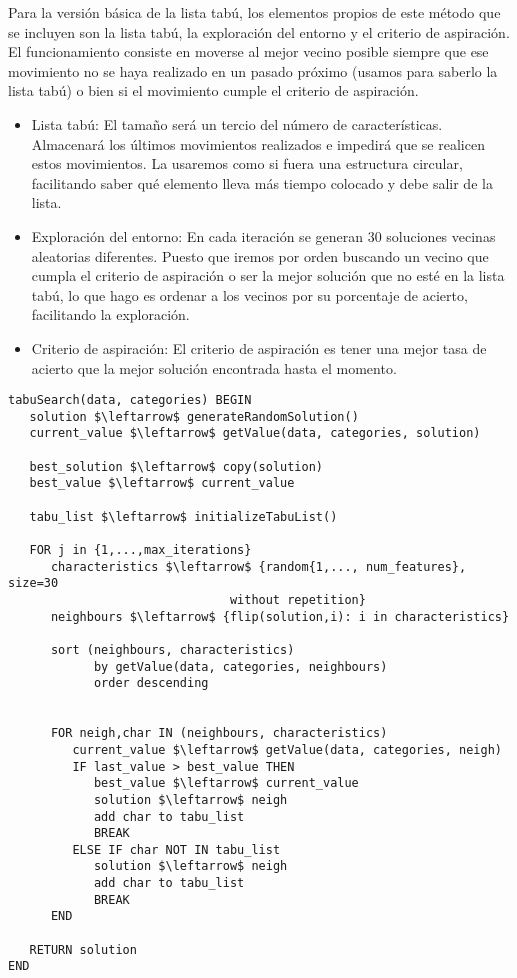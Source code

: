 \documentclass[11pt,leqno]{article}
\begin{document}
	Para la versión básica de la lista tabú, los elementos propios de este método que se incluyen son la lista tabú, la exploración del entorno y el criterio de aspiración. El funcionamiento consiste en moverse al mejor vecino posible siempre que ese movimiento no se haya realizado en un pasado próximo (usamos para saberlo la lista tabú) o bien si el movimiento cumple el criterio de aspiración.
	\begin{itemize}
	\item Lista tabú: El tamaño será un tercio del número de características. Almacenará los últimos movimientos realizados e impedirá que se realicen estos movimientos. La usaremos como si fuera una estructura circular, facilitando saber qué elemento lleva más tiempo colocado y debe salir de la lista.
	\item Exploración del entorno: En cada iteración se generan 30 soluciones vecinas aleatorias diferentes. Puesto que iremos por orden buscando un vecino que cumpla el criterio de aspiración o ser la mejor solución que no esté en la lista tabú, lo que hago es ordenar a los vecinos por su porcentaje de acierto, facilitando la exploración.
	\item Criterio de aspiración: El criterio de aspiración es tener una mejor tasa de acierto que la mejor solución encontrada hasta el momento. 
	\end{itemize}

	\begin{lstlisting}[mathescape=true]
tabuSearch(data, categories) BEGIN
   solution $\leftarrow$ generateRandomSolution()
   current_value $\leftarrow$ getValue(data, categories, solution)
   
   best_solution $\leftarrow$ copy(solution)
   best_value $\leftarrow$ current_value
   
   tabu_list $\leftarrow$ initializeTabuList()
	
   FOR j in {1,...,max_iterations}
      characteristics $\leftarrow$ {random{1,..., num_features}, size=30
                               without repetition}
      neighbours $\leftarrow$ {flip(solution,i): i in characteristics}
      
      sort (neighbours, characteristics) 
            by getValue(data, categories, neighbours) 
            order descending
      
	  
      FOR neigh,char IN (neighbours, characteristics)
         current_value $\leftarrow$ getValue(data, categories, neigh)
         IF last_value > best_value THEN
            best_value $\leftarrow$ current_value
            solution $\leftarrow$ neigh
            add char to tabu_list
            BREAK
         ELSE IF char NOT IN tabu_list
            solution $\leftarrow$ neigh
            add char to tabu_list
            BREAK
      END
      
   RETURN solution
END
	\end{lstlisting}
	
\end{document}
